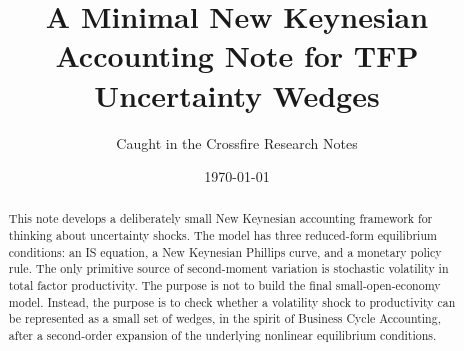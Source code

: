 \documentclass[11pt]{article}
\title{A Minimal New Keynesian Accounting Note for TFP Uncertainty Wedges}
\author{Caught in the Crossfire Research Notes}
\date{\today}
\begin{document}
\maketitle

\begin{abstract}
This note develops a deliberately small New Keynesian accounting framework for
thinking about uncertainty shocks. The model has three reduced-form equilibrium
conditions: an IS equation, a New Keynesian Phillips curve, and a monetary policy
rule. The only primitive source of second-moment variation is stochastic
volatility in total factor productivity. The purpose is not to build the final
small-open-economy model. Instead, the purpose is to check whether a volatility
shock to productivity can be represented as a small set of wedges, in the spirit
of Business Cycle Accounting, after a second-order expansion of the underlying
nonlinear equilibrium conditions.
\end{abstract}

\tableofcontents

\clearpage









\appendix

\end{document}
